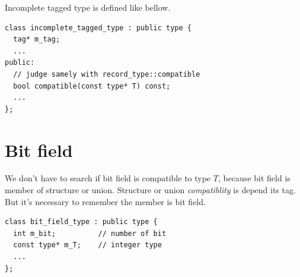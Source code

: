 Incomplete tagged type is defined like bellow.
\begin{verbatim}
class incomplete_tagged_type : public type {
  tag* m_tag;
  ...
public:
  // judge samely with record_type::compatible
  bool compatible(const type* T) const;
  ...
};
\end{verbatim}

\section{Bit field}

We don't have to search if bit field is compatible
to type $T$, because bit field is member of structure
or union. Structure or union {\it compatiblity} is
depend its tag. But it's necessary to remember
the member is bit field.

\begin{verbatim}
class bit_field_type : public type {
  int m_bit;          // number of bit
  const type* m_T;    // integer type
  ...
};
\end{verbatim}
